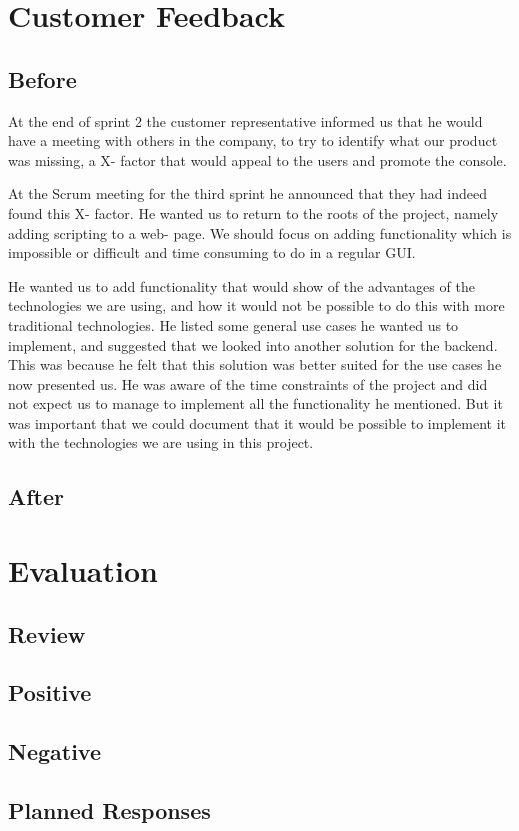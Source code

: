 \section{Customer Feedback}

\subsection{Before}
At the end of sprint 2 the customer representative informed us that he would have a meeting with others in the company, to try to identify what our product was missing, a X- factor that would appeal to the users and promote the console.

At the Scrum meeting for the third sprint he announced that they had indeed found this X- factor. He wanted us to return to the roots of the project, namely adding scripting to a web- page. We should focus on adding functionality which is impossible or difficult and time consuming to do in a regular GUI.

He wanted us to add functionality that would show of the advantages of the technologies we are using, and how it would not be possible to do this with more traditional technologies. He listed some general use cases he wanted us to implement, and suggested that we looked into another solution for the backend. This was because he felt that this solution was better suited for the use cases he now presented us. He was aware of the time constraints of the project and did not expect us to manage to implement all the functionality he mentioned. But it was important that we could document that it would be possible to implement it with the technologies we are using in this project.

\subsection{After}

\section{Evaluation}
\subsection{Review}
\subsection{Positive}
\subsection{Negative}
\subsection{Planned Responses}
